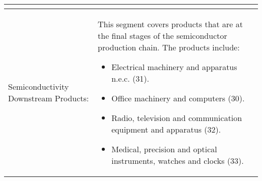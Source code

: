 \begin{appendices}
\begin{longtable}{|>{\raggedright\arraybackslash}p{6cm}|>{\raggedright\arraybackslash}p{8cm}|}
\begin{itemize}
    \end{itemize} \\
    \hline
    Semiconductivity Downstream Products: & This segment covers products that are at the final stages of the semiconductor production chain. The products include:
    \begin{itemize}
        \item Electrical machinery and apparatus n.e.c. (31).
        \item Office machinery and computers (30).
        \item Radio, television and communication equipment and apparatus (32).
        \item Medical, precision and optical instruments, watches and clocks (33).
    \end{itemize} \\
    \hline
\end{longtable}



\end{appendices}
